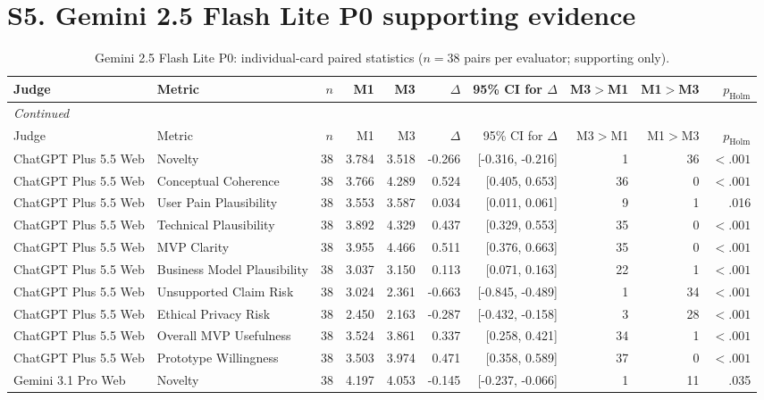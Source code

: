 \documentclass[10pt]{article}
\begin{document}
\section*{S5. Gemini 2.5 Flash Lite P0 supporting evidence}
\begin{landscape}
\small
\setlength{\LTcapwidth}{\textwidth}
\begin{longtable}{llrrrrrrrr}
\caption{Gemini 2.5 Flash Lite P0: individual-card paired statistics ($n=38$ pairs per evaluator; supporting only).}\label{tab:s6-ind25p0}\\
\toprule
Judge & Metric & $n$ & M1 & M3 & $\Delta$ & 95\% CI for $\Delta$ & M3$>$M1 & M1$>$M3 & $p_{\mathrm{Holm}}$ \\
\midrule\endfirsthead
\multicolumn{10}{l}{\small\itshape Continued}\\
\toprule Judge & Metric & $n$ & M1 & M3 & $\Delta$ & 95\% CI for $\Delta$ & M3$>$M1 & M1$>$M3 & $p_{\mathrm{Holm}}$ \\ \midrule\endhead
\bottomrule\endfoot
ChatGPT Plus 5.5 Web & Novelty & 38 & 3.784 & 3.518 & -0.266 & [-0.316, -0.216] & 1 & 36 & $<.001$ \\
ChatGPT Plus 5.5 Web & Conceptual Coherence & 38 & 3.766 & 4.289 & 0.524 & [0.405, 0.653] & 36 & 0 & $<.001$ \\
ChatGPT Plus 5.5 Web & User Pain Plausibility & 38 & 3.553 & 3.587 & 0.034 & [0.011, 0.061] & 9 & 1 & .016 \\
ChatGPT Plus 5.5 Web & Technical Plausibility & 38 & 3.892 & 4.329 & 0.437 & [0.329, 0.553] & 35 & 0 & $<.001$ \\
ChatGPT Plus 5.5 Web & MVP Clarity & 38 & 3.955 & 4.466 & 0.511 & [0.376, 0.663] & 35 & 0 & $<.001$ \\
ChatGPT Plus 5.5 Web & Business Model Plausibility & 38 & 3.037 & 3.150 & 0.113 & [0.071, 0.163] & 22 & 1 & $<.001$ \\
ChatGPT Plus 5.5 Web & Unsupported Claim Risk & 38 & 3.024 & 2.361 & -0.663 & [-0.845, -0.489] & 1 & 34 & $<.001$ \\
ChatGPT Plus 5.5 Web & Ethical Privacy Risk & 38 & 2.450 & 2.163 & -0.287 & [-0.432, -0.158] & 3 & 28 & $<.001$ \\
ChatGPT Plus 5.5 Web & Overall MVP Usefulness & 38 & 3.524 & 3.861 & 0.337 & [0.258, 0.421] & 34 & 1 & $<.001$ \\
ChatGPT Plus 5.5 Web & Prototype Willingness & 38 & 3.503 & 3.974 & 0.471 & [0.358, 0.589] & 37 & 0 & $<.001$ \\
Gemini 3.1 Pro Web & Novelty & 38 & 4.197 & 4.053 & -0.145 & [-0.237, -0.066] & 1 & 11 & .035 \\

\end{longtable}
\end{landscape}
\end{document}
